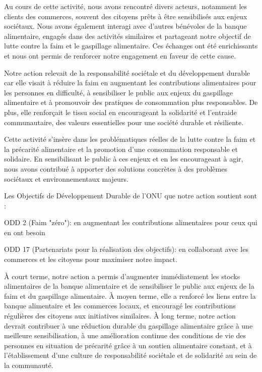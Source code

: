 \documentclass[11pt, openright]{book}
\begin{document}
     Au cours de cette activité, nous avons rencontré divers acteurs, notamment les clients des commerces, souvent des citoyens prêts à être sensibilisés aux enjeux sociétaux. Nous avons également interagi avec d'autres bénévoles de la banque alimentaire, engagés dans des activités similaires et partageant notre objectif de lutte contre la faim et le gaspillage alimentaire. Ces échanges ont été enrichissants et nous ont permis de renforcer notre engagement en faveur de cette cause.

     Notre action relevait de la responsabilité sociétale et du développement durable car elle visait à réduire la faim en augmentant les contributions alimentaires pour les personnes en difficulté, à sensibiliser le public aux enjeux du gaspillage alimentaire et à promouvoir des pratiques de consommation plus responsables. De plus, elle renforçait le tissu social en encourageant la solidarité et l'entraide communautaire, des valeurs essentielles pour une société durable et résiliente.

     Cette activité s'insère dans les problématiques réelles de la lutte contre la faim et la précarité alimentaire et la promotion d'une consommation responsable et solidaire. En sensibilisant le public à ces enjeux et en les encourageant à agir, nous avons contribué à apporter des solutions concrètes à des problèmes sociétaux et environnementaux majeurs.

     Les Objectifs de Développement Durable de l'ONU que notre action soutient sont :
      \begin{items}{-15pt}{-15pt}
         \item ODD 2 (Faim "zéro"): en augmentant les contributions alimentaires pour ceux qui en ont besoin 
         \item ODD 17 (Partenariats pour la réalisation des objectifs): en collaborant avec les commerces et les citoyens pour maximiser notre impact.
     \end{items}

     À court terme, notre action a permis d'augmenter immédiatement les stocks alimentaires de la banque alimentaire et de sensibiliser le public aux enjeux de la faim et du gaspillage alimentaire. À moyen terme, elle a renforcé les liens entre la banque alimentaire et les commerces locaux, et encouragé les contributions régulières des citoyens aux initiatives similaires. À long terme, notre action devrait contribuer à une réduction durable du gaspillage alimentaire grâce à une meilleure sensibilisation, à une amélioration continue des conditions de vie des personnes en situation de précarité grâce à un soutien alimentaire constant, et à l'établissement d'une culture de responsabilité sociétale et de solidarité au sein de la communauté.
\end{document}
